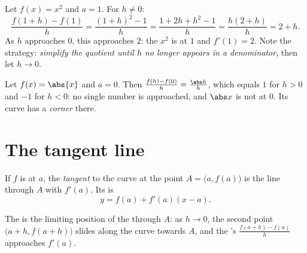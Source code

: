 \begin{example}\label{ex:g11:deriv:atpoint}
Let $f(x) = x^2$ and $a = 1$. For $h \neq 0$:
\[
\frac{f(1+h) - f(1)}{h}
= \frac{(1+h)^2 - 1}{h}
= \frac{1 + 2h + h^2 - 1}{h}
= \frac{h(2 + h)}{h}
= 2 + h .
\]
As $h$ approaches $0$, this approaches $2$: the  $x^2$ is
 at $1$ and $f'(1) = 2$. Note the strategy: \emph{simplify
the quotient until $h$ no longer appears in a denominator}, then let
$h \to 0$.
\end{example}

\begin{example}
Let $f(x) = \abs{x}$ and $a = 0$. Then
$\frac{f(h) - f(0)}{h} = \frac{\abs h}{h}$, which equals $1$ for $h > 0$
and $-1$ for $h < 0$: no single number is approached, and $\abs x$ is not
 at $0$. Its curve has a \emph{corner} there.
\end{example}

\section{The tangent line}

\begin{definition}[Tangent]\label{def:g11:deriv:tangent}
If $f$ is  at $a$, the \emph{tangent} to the
curve at the point $A = \bigl(a, f(a)\bigr)$ is the line through $A$ with
 $f'(a)$. Its  is
\[
y = f(a) + f'(a)(x - a).
\]
\end{definition}

The  is the limiting position of the  through $A$: as
$h \to 0$, the second point $\bigl(a+h, f(a+h)\bigr)$ slides along the
curve towards $A$, and the 's  $\frac{f(a+h)-f(a)}{h}$
approaches $f'(a)$.

